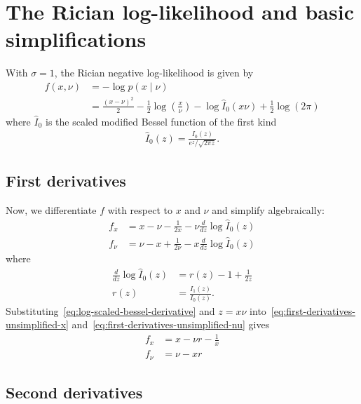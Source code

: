 \documentclass{article}
\begin{document}
\section{The Rician log-likelihood and basic simplifications}

With $\sigma=1$, the Rician negative log-likelihood is given by
%
\begin{align}
  f(x,\nu) & = -\log p(x\mid\nu)                                                                                               \\
           & = \frac{(x-\nu)^2}{2} - \frac{1}{2}\log\left(\frac{x}{\nu}\right) - \log \hat{I}_0(x \nu) + \frac{1}{2}\log(2\pi)
\end{align}
%
where $\hat{I}_0$ is the scaled modified Bessel function of the first kind
%
\begin{align}
  \hat{I}_0(z) = \frac{I_0(z)}{e^{z}/\sqrt{2\pi z}}.
\end{align}

\subsection{First derivatives}

Now, we differentiate $f$ with respect to $x$ and $\nu$ and simplify algebraically:
%
\begin{align}
  f_x   & = x-\nu -\frac{1}{2x} - \nu\frac{d}{dz}\log\hat{I}_0(z) \label{eq:first-derivatives-unsimplified-x}  \\
  f_\nu & = \nu-x +\frac{1}{2\nu} - x\frac{d}{dz}\log\hat{I}_0(z) \label{eq:first-derivatives-unsimplified-nu}
\end{align}
%
where
%
\begin{align}
  \frac{d}{dz}\log\hat{I}_0(z) & = r(z) - 1 + \frac{1}{2z} \label{eq:log-scaled-bessel-derivative} \\
  r(z)                         & = \frac{I_1(z)}{I_0(z)}. \label{eq:ratio-r}
\end{align}
%
Substituting~\eqref{eq:log-scaled-bessel-derivative} and $z=x\nu$ into~\eqref{eq:first-derivatives-unsimplified-x} and~\eqref{eq:first-derivatives-unsimplified-nu} gives
%
\begin{align}
  f_x   & = x - \nu r - \frac{1}{x} \label{eq:first-derivatives-simplified-x} \\
  f_\nu & = \nu - x r \label{eq:first-derivatives-simplified-nu}
\end{align}

\subsection{Second derivatives}
\end{document}
